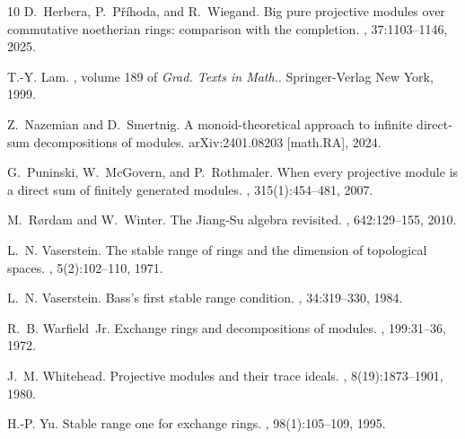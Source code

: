 \documentclass[11pt]{amsart}
\numberwithin{equation}{section}
\theoremstyle{definition}
\theoremstyle{plain}
\theoremstyle{definition}
\begin{document}
\begin{thebibliography}{10}
	D.~Herbera, P.~Příhoda, and R.~Wiegand.
	\newblock Big pure projective modules over commutative noetherian rings:
	comparison with the completion. , 37:1103--1146, 2025.
	
	T.-Y. Lam.
	, volume 189 of {\em Grad. Texts in Math.}.
	\newblock Springer-Verlag New York, 1999.
	
	Z.~Nazemian and D.~Smertnig.
	\newblock A monoid-theoretical approach to infinite direct-sum decompositions
	of modules.
	\newblock arXiv:2401.08203 [math.RA], 2024.
	
	G.~Puninski, W.~McGovern, and P.~Rothmaler.
	\newblock When every projective module is a direct sum of finitely generated
	modules.
	, 315(1):454--481, 2007.
	
	M.~R{\o}rdam and W.~Winter.
	\newblock The {J}iang-{S}u algebra revisited.
	, 642:129--155, 2010.
	
	L.~N. Vaserstein.
	\newblock The stable range of rings and the dimension of topological spaces.
	, 5(2):102--110, 1971.
	
	L.~N. Vaserstein.
	\newblock Bass's first stable range condition.
	, 34:319--330, 1984.
	
	R.~B. Warfield~Jr.
	\newblock Exchange rings and decompositions of modules.
	, 199:31--36, 1972.
	
	J.~M. Whitehead.
	\newblock Projective modules and their trace ideals.
	, 8(19):1873--1901, 1980.
	
	H.-P. Yu.
	\newblock Stable range one for exchange rings.
	, 98(1):105--109, 1995.
	
\end{thebibliography}
\end{document}

